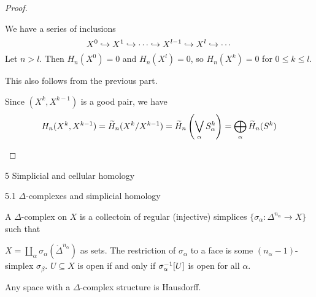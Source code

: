 \begin{proof}
  \lv
  \begin{enum}
    \io
    We have a series of inclusions
    \[ X^0 \hookrightarrow X^1 \hookrightarrow \cdots \hookrightarrow X^{l-1} \hookrightarrow X^l \hookrightarrow \cdots \]
    Let $n>l$.
    Then $H_n(X^0)=0$ and $H_n(X^l)=0$, so $H_n(X^k)=0$ for $0 \leq k \leq l$.

    \io
    This also follows from the previous part.

    \io
    Since $(X^k,X^{k-1})$ is a good pair, we have
    \[ H_n(X^k,X^{k-1}) = \widetilde H_n(X^k/X^{k-1}) = \widetilde H_n \left( \bigvee_\alpha S_\alpha^k \right) = \bigoplus_\alpha \widetilde H_n(S^k) \qedhere \]
  \end{enum}
\end{proof}

5 Simplicial and cellular homology

5.1 $\Delta$-complexes and simplicial homology

\begin{defn}
  A $\Delta$-complex on $X$ is a collectoin of regular (injective) simplices $\{ \sigma_\alpha: \Delta^{n_\alpha} \to X\}$ such that
  \begin{enum}
    \io $X = \coprod_\alpha \sigma_\alpha( \mathring{\Delta}^{n_\alpha} )$ as sets.
    \io The restriction of $\sigma_\alpha$ to a face is some $(n_\alpha-1)$-simplex $\sigma_\beta$.
    \io $U \subseteq X$ is open if and only if $\sigma_\alpha^{-1}[U]$ is open for all $\alpha$.
  \end{enum}
\end{defn}

\begin{rmk}
  Any space with a $\Delta$-complex structure is Hausdorff.
\end{rmk}
